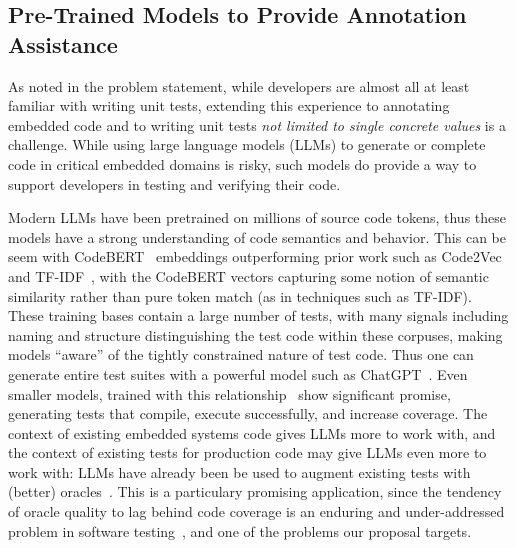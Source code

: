 
\subsection{Pre-Trained Models to Provide Annotation Assistance}

As noted in the problem statement, while developers are almost all at
least familiar with writing unit tests, extending this experience to
annotating embedded code and to writing unit tests \emph{not limited
  to single concrete values} is a challenge.  While using large
language models (LLMs) to generate or complete code in critical
embedded domains is risky, such models do provide a way to support
developers in testing and verifying their code.

Modern LLMs have been pretrained on millions of source code tokens, thus these models have a strong understanding of code semantics 
and behavior. This can be seem with CodeBERT~\cite{codebert} embeddings outperforming prior work such as Code2Vec~\cite{code2vec} 
and TF-IDF~\cite{tfidf}, with the CodeBERT vectors capturing some
notion of semantic similarity rather than pure token match (as in techniques 
such as TF-IDF).  These training bases contain a large number of
tests, with many signals including naming and structure distinguishing
the test code within these corpuses, making
models ``aware'' of the tightly constrained nature of test code.
Thus one can generate entire test suites with a powerful model such as ChatGPT~\cite{gpttestgen, siddiq2023empirical}. 
Even smaller models, trained with this relationship~\cite{catlm, starcoder} show significant promise, generating tests that compile, execute successfully, and 
increase coverage.  The context of existing embedded systems code gives LLMs more to work with,
and the context of existing tests for production code may give LLMs
even more to work with: LLMs have already been be used to augment existing tests
with (better) oracles~\cite{OracleGEN}.  This is a particulary promising
application, since the tendency of oracle quality to lag behind code coverage
is an enduring and under-addressed problem in software
testing~\cite{MindGap}, and one of the problems our proposal targets.


